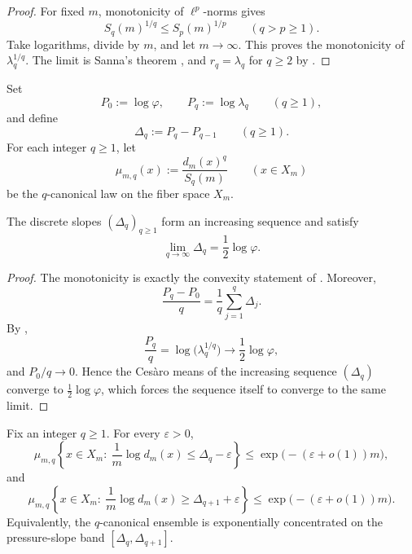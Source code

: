\begin{proof}
For fixed \(m\), monotonicity of \(\ell^p\)-norms gives
\[
  S_q(m)^{1/q}\le S_p(m)^{1/p}
  \qquad (q>p\ge 1).
\]
Take logarithms, divide by \(m\), and let \(m\to\infty\).  This proves the
monotonicity of \(\lambda_q^{1/q}\).  The limit is Sanna's theorem
\cite{Sanna2025}, and \(r_q=\lambda_q\) for \(q\ge 2\) by
.
\end{proof}

\begin{definition}
\label{def:pressure-slopes}
Set
\[
  P_0:=\log\varphi,
  \qquad
  P_q:=\log\lambda_q
  \qquad (q\ge 1),
\]
and define
\[
  \Delta_q:=P_q-P_{q-1}
  \qquad (q\ge 1).
\]
For each integer \(q\ge 1\), let
\[
  \mu_{m,q}(x):=\frac{d_m(x)^q}{S_q(m)}
  \qquad (x\in X_m)
\]
be the \(q\)-canonical law on the fiber space \(X_m\).
\end{definition}

\begin{corollary}
\label{cor:pressure-slopes}
The discrete slopes \((\Delta_q)_{q\ge 1}\) form an increasing sequence and
satisfy
\[
  \lim_{q\to\infty}\Delta_q=\frac12\log\varphi.
\]
\end{corollary}

\begin{proof}
The monotonicity is exactly the convexity statement of
.  Moreover,
\[
  \frac{P_q-P_0}{q}
  =
  \frac1q\sum_{j=1}^q \Delta_j.
\]
By ,
\[
  \frac{P_q}{q}
  =
  \log\bigl(\lambda_q^{1/q}\bigr)
  \to
  \frac12\log\varphi,
\]
and \(P_0/q\to 0\).  Hence the Ces\`aro means of the increasing sequence
\((\Delta_q)\) converge to \(\frac12\log\varphi\), which forces the sequence
itself to converge to the same limit.
\end{proof}

\begin{theorem}
\label{thm:gibbs-selection}
Fix an integer \(q\ge 1\).  For every \(\varepsilon>0\),
\[
  \mu_{m,q}\!\left\{
    x\in X_m:\ \frac1m\log d_m(x)\le \Delta_q-\varepsilon
  \right\}
  \le
  \exp\bigl(-(\varepsilon+o(1))m\bigr),
\]
and
\[
  \mu_{m,q}\!\left\{
    x\in X_m:\ \frac1m\log d_m(x)\ge \Delta_{q+1}+\varepsilon
  \right\}
  \le
  \exp\bigl(-(\varepsilon+o(1))m\bigr).
\]
Equivalently, the \(q\)-canonical ensemble is exponentially concentrated on the
pressure-slope band \([\Delta_q,\Delta_{q+1}]\).
\end{theorem}

